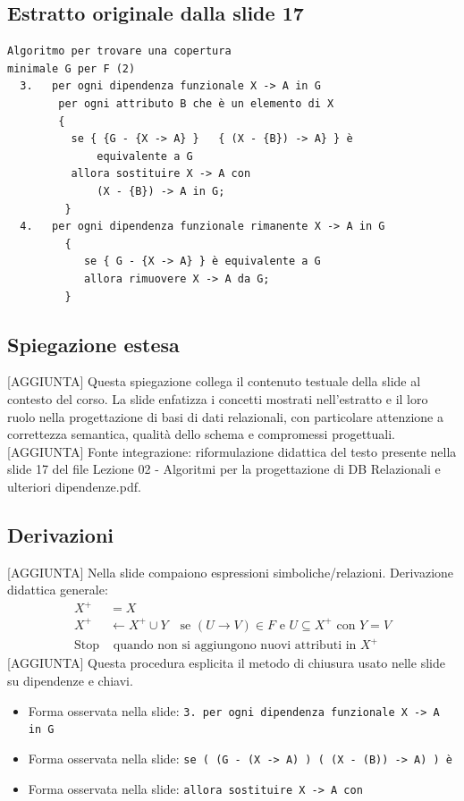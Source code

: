 \documentclass[11pt]{article}
\begin{document}
\subsection*{Estratto originale dalla slide 17}
\begin{lstlisting}
Algoritmo per trovare una copertura
minimale G per F (2)
  3.   per ogni dipendenza funzionale X -> A in G
        per ogni attributo B che è un elemento di X
        {
          se { {G - {X -> A} }   { (X - {B}) -> A} } è
              equivalente a G
          allora sostituire X -> A con
              (X - {B}) -> A in G;
         }
  4.   per ogni dipendenza funzionale rimanente X -> A in G
         {
            se { G - {X -> A} } è equivalente a G
            allora rimuovere X -> A da G;
         }
\end{lstlisting}
\subsection*{Spiegazione estesa}
[AGGIUNTA] Questa spiegazione collega il contenuto testuale della slide al contesto del corso. La slide enfatizza i concetti mostrati nell'estratto e il loro ruolo nella progettazione di basi di dati relazionali, con particolare attenzione a correttezza semantica, qualità dello schema e compromessi progettuali.
[AGGIUNTA] Fonte integrazione: riformulazione didattica del testo presente nella slide 17 del file Lezione 02 - Algoritmi per la progettazione di DB Relazionali e ulteriori dipendenze.pdf.
\subsection*{Derivazioni}
[AGGIUNTA] Nella slide compaiono espressioni simboliche/relazioni. Derivazione didattica generale:
\begin{align*}
X^+ &= X \\
X^+ &\leftarrow X^+ \cup Y \quad \text{se } (U \to V) \in F \text{ e } U \subseteq X^+ \text{ con } Y=V \\
\text{Stop} &\text{ quando non si aggiungono nuovi attributi in } X^+
\end{align*}
[AGGIUNTA] Questa procedura esplicita il metodo di chiusura usato nelle slide su dipendenze e chiavi.
\begin{itemize}[leftmargin=*]
\item Forma osservata nella slide: \texttt{3.   per ogni dipendenza funzionale X -> A in G}
\item Forma osservata nella slide: \texttt{se ( (G - (X -> A) )   ( (X - (B)) -> A) ) è}
\item Forma osservata nella slide: \texttt{allora sostituire X -> A con}
\end{itemize}
\end{document}
